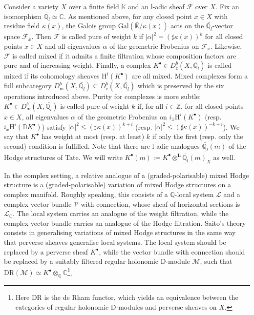 \documentclass[11pt,english]{article}
\numberwithin{equation}{section}
\numberwithin{figure}{section}
\theoremstyle{definition}
\theoremstyle{plain}
\theoremstyle{remark}
\newcommand\HH{\mathrm{H}}
\newcommand\ZZ{\mathbb{Z}}
\newcommand\QQ{\mathbb{Q}}
\newcommand\KK{\mathbb{K}}
\newcommand\CC{\mathbb{C}}
\begin{document}
Consider a variety $X$ over a finite field $\KK$ and an l-adic sheaf
$\mathcal{F}$ over $X$. Fix an isomorphism $\bar{\QQ_{l}}\simeq\CC$.
As mentioned above, for any closed point $x\in X$ with residue field
$\kappa(x)$, the Galois group $\mathrm{Gal}(\bar{\KK}/\kappa(x))$
acts on the $\bar{\QQ_{l}}$-vector space $\mathcal{F}_{\overline{x}}$.
Then $\mathcal{F}$ is called pure of weight $k$ if $\vert\alpha\vert^{2}=\left(\sharp\kappa(x)\right)^{k}$
for all closed points $x\in X$ and all eigenvalues $\alpha$ of the
geometric Frobenius on $\mathcal{F}_{\overline{x}}$. Likewise, $\mathcal{F}$
is called mixed if it admits a finite filtration whose composition
factors are pure and of increasing weight. Finally, a complex $K^{\bullet}\in D_{\mathrm{c}}^{b}(X,\bar{\QQ_{l}})$
is called mixed if its cohomology sheaves $\HH^{i}(K^{\bullet})$
are all mixed. Mixed complexes form a full subcategory $D_{\mathrm{m}}^{b}(X,\bar{\QQ_{l}})\subseteq D_{\mathrm{c}}^{b}(X,\bar{\QQ_{l}})$
which is preserved by the six operations introduced above. Purity
for complexes is more subtle: $K^{\bullet}\in D_{\mathrm{m}}^{b}(X,\bar{\QQ_{l}})$
is called pure of weight $k$ if, for all $i\in\ZZ$, for all closed
points $x\in X$, all eigenvalues $\alpha$ of the geometric Frobenius
on $i_{\overline{x}}\HH^{i}(K^{\bullet})$ (resp. $i_{\overline{x}}\HH^{i}(\mathbb{D}K^{\bullet})$)
satisfy $\vert\alpha\vert^{2}\leq\left(\sharp\kappa(x)\right)^{k+i}$
(resp. $\vert\alpha\vert^{2}\leq\left(\sharp\kappa(x)\right)^{-k+i}$).
We say that $K^{\bullet}$ has weight at most (resp. at least) $k$
if only the first (resp. only the second) condition is fulfilled.
Note that there are l-adic analogues $\underline{\bar{\QQ_{l}}}(m)$
of the Hodge structures of Tate. We will write $K^{\bullet}(m):=K^{\bullet}\otimes^{\mathbf{L}}\underline{\bar{\QQ_{l}}}(m)_{X}$
as well. 

In the complex setting, a relative analogue of a (graded-polarisable)
mixed Hodge structure is a (graded-polarisable) variation of mixed
Hodge structures on a complex manifold. Roughly speaking, this consists
of a $\QQ$-local system $\mathcal{L}$ and a complex vector bundle
$\mathcal{V}$ with connection, whose sheaf of horizontal sections
is $\mathcal{L}_{\CC}$. The local system carries an analogue of the
weight filtration, while the complex vector bundle carries an analogue
of the Hodge filtration. Saito's theory consists in generalising variations
of mixed Hodge structures in the same way that perverse sheaves generalise
local systems. The local system should be replaced by a perverse sheaf
$K^{\bullet}$, while the vector bundle with connection should be
replaced by a suitably filtered regular holonomic D-module $\mathcal{M}$,
such that $\mathrm{DR}(\mathcal{M})\simeq K^{\bullet}\otimes_{\QQ}\CC$\footnote{Here $\mathrm{DR}$ is the de Rham functor, which yields an equivalence
between the categories of regular holonomic D-modules and perverse
sheaves on $X$.}.
\end{document}
